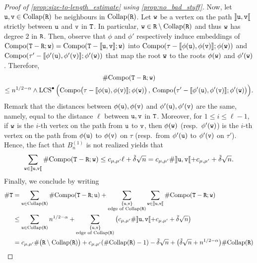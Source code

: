 \documentclass[11pt,reqno]{amsart}
\newcommand{\LCS}{\operatorname{LCS}}
\begin{document}
\begin{proof}[Proof of \cref{prop:size-to-length_estimate} using \cref{prop:no_bad_stuff}]
Now, let $\mathtt{u},\mathtt{v}\in\mathrm{Collap}(\mathtt{R})$ be neighbours in $\mathrm{Collap}(\mathtt{R})$. Let $\mathtt{w}$ be a vertex on the path $\rrbracket \mathtt{u},\mathtt{v}\llbracket$ strictly between $\mathtt{u}$ and $\mathtt{v}$ in $\mathtt{T}$. In particular, $\mathtt{w}\in \mathtt{R}\setminus \mathrm{Collap}(\mathtt{R})$ and thus $\mathtt{w}$ has degree $2$ in $\mathtt{R}$. Then, observe that $\phi$ and $\phi'$ respectively induce embeddings of $\mathrm{Compo}(\mathtt{T}-\mathtt{R};\mathtt{w})=\mathrm{Compo}(\mathtt{T}-\llbracket\mathtt{u},\mathtt{v}\rrbracket;\mathtt{w})$ into $\mathrm{Compo}(\tau-\llbracket \phi(\mathtt{u}),\phi(\mathtt{v})\rrbracket;\phi(\mathtt{w}))$ and $\mathrm{Compo}(\tau'-\llbracket \phi'(\mathtt{u}),\phi'(\mathtt{v})\rrbracket;\phi'(\mathtt{w}))$ that map the root $\mathtt{w}$ to the roots $\phi(\mathtt{w})$ and $\phi'(\mathtt{w})$. Therefore,
\begin{multline*}
\#\mathrm{Compo}(\ttT-\ttR;\ttw)\\
\leq n^{1/2-\alpha}\wedge \LCS^\bullet\Big(\mathrm{Compo}\big(\tau-\llbracket \phi(\ttu),\phi(\ttv)\rrbracket;\phi(\ttw)\big)\, ,\, \mathrm{Compo}\big(\tau'-\llbracket \phi'(\ttu),\phi'(\ttv)\rrbracket;\phi'(\ttw)\big)\Big).
\end{multline*}
Remark that the distances between $\phi(\mathtt{u}),\phi(\mathtt{v})$ and $\phi'(\mathtt{u}),\phi'(\mathtt{v})$ are the same, namely, equal to the distance $\ell$ between $\mathtt{u},\mathtt{v}$ in $\mathtt{T}$.
Moreover, for $1\leq i\leq \ell-1$, if $\mathtt{w}$ is the $i$-th vertex on the path from $\mathtt{u}$ to $\mathtt{v}$, then $\phi(\mathtt{w})$ (resp.~$\phi'(\mathtt{w})$) is the $i$-th vertex on the path from $\phi(\mathtt{u})$ to $\phi(\mathtt{v})$ on $\tau$ (resp.~from $\phi'(\mathtt{u})$ to $\phi'(\mathtt{v})$ on $\tau'$). Hence, the fact that $B_n^{(1)}$ is not realized yields that 
\[\sum_{\mathtt{w}\in \rrbracket \mathtt{u},\mathtt{v}\llbracket}\#\mathrm{Compo}(\mathtt{T}-\mathtt{R};\mathtt{w})\leq c_{\mu,\mu'}\ell+\tilde{\delta}\sqrt{n}=c_{\mu,\mu'}\#\rrbracket \mathtt{u},\mathtt{v}\llbracket+c_{\mu,\mu'}+\tilde{\delta}\sqrt{n}.\]
Finally, we conclude by writing
\begin{align*}
\#\ttT&=\sum_{\ttu\in\mathrm{Collap}(\ttR)}\#\mathrm{Compo}(\ttT-\ttR;\ttu)+\sum_{\substack{\{\ttu,\ttv\}\\ \text{edge of }\mathrm{Collap}(\ttR)}}\sum_{\ttw\in\rrbracket \ttu,\ttv\llbracket}\#\mathrm{Compo}(\ttT-\ttR;\ttw)\\
&\leq \sum_{\ttu\in\mathrm{Collap}(\ttR)}n^{1/2-\alpha}+\sum_{\substack{\{\ttu,\ttv\}\\ \text{edge of }\mathrm{Collap}(\ttR)}}\big(c_{\mu,\mu'}\#\rrbracket \ttu,\ttv\llbracket+c_{\mu,\mu'}+\tilde{\delta}\sqrt{n}\big)\\
&=c_{\mu,\mu'}\#\big(\ttR\setminus \mathrm{Collap}(\ttR)\big) +c_{\mu,\mu'}(\#\mathrm{Collap}(\ttR)-1) -\tilde{\delta}\sqrt{n}+\big(\tilde{\delta}\sqrt{n}+n^{1/2-\alpha}\big)\#\mathrm{Collap}(\ttR)\\

\end{align*}
\end{proof}
\end{document}
